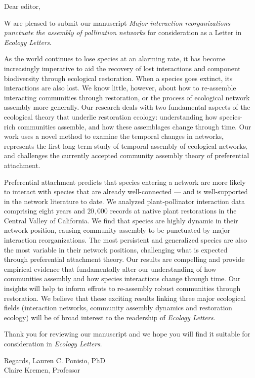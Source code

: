 \documentclass[12pt]{letter}
\begin{document}
\begin{letter}{}

  \opening{Dear editor,}

  W are pleased to submit our manuscript \textit{Major interaction
    reorganizations punctuate the assembly of pollination networks}
  for consideration as a Letter in \textit{Ecology Letters}.

  As the world continues to lose species at an alarming rate, it has
  become increasingly imperative to aid the recovery of lost
  interactions and component biodiversity through ecological
  restoration. When a species goes extinct, its interactions are also
  lost. We know little, however, about how to re-assemble interacting
  communities through restoration, or the process of ecological
  network assembly more generally. Our research deals with two
  fundamental aspects of the ecological theory that underlie
  restoration ecology: understanding how species-rich communities
  assemble, and how these assemblages change through time. Our work
  uses a novel method to examine the temporal changes in networks,
  represents the first long-term study of temporal assembly of
  ecological networks, and challenges the currently accepted community
  assembly theory of preferential attachment.

  Preferential attachment predicts that species entering a network are
  more likely to interact with species that are already well-connected
  --- and is well-supported in the network literature to date.  We
  analyzed plant-pollinator interaction data comprising eight years
  and \texttildelow $20,000$ records at native plant restorations in
  the Central Valley of California. We find that species are highly
  dynamic in their network position, causing community assembly to be
  punctuated by major interaction reorganizations. The most persistent
  and generalized species are also the most variable in their network
  positions, challenging what is expected through preferential
  attachment theory. Our results are compelling and provide empirical
  evidence that fundamentally alter our understanding of how
  communities assembly and how species interactions change through
  time. Our insights will help to inform effrots to re-assembly robust
  communities through restoration.  We believe that these exciting
  results linking three major ecological fields (interaction networks,
  community assembly dynamics and restoration ecology) will be of
  broad interest to the readership of \textit{Ecology Letters}.


  Thank you for reviewing our manuscript and we hope you will find it
  suitable for consideration in \textit{Ecology Letters}.
  
  Regards,
  Lauren C. Ponisio, PhD\\
  Claire Kremen, Professor
\end{letter}
\end{document}
